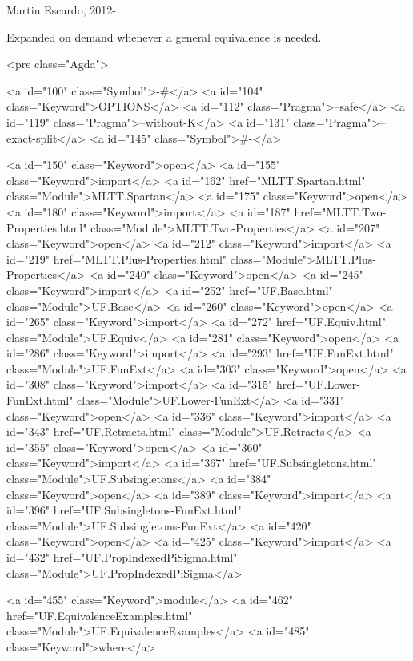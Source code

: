 Martin Escardo, 2012-

Expanded on demand whenever a general equivalence is needed.

<pre class="Agda">

<a id="100" class="Symbol">{-#</a> <a id="104" class="Keyword">OPTIONS</a> <a id="112" class="Pragma">--safe</a> <a id="119" class="Pragma">--without-K</a> <a id="131" class="Pragma">--exact-split</a> <a id="145" class="Symbol">#-}</a>

<a id="150" class="Keyword">open</a> <a id="155" class="Keyword">import</a> <a id="162" href="MLTT.Spartan.html" class="Module">MLTT.Spartan</a>
<a id="175" class="Keyword">open</a> <a id="180" class="Keyword">import</a> <a id="187" href="MLTT.Two-Properties.html" class="Module">MLTT.Two-Properties</a>
<a id="207" class="Keyword">open</a> <a id="212" class="Keyword">import</a> <a id="219" href="MLTT.Plus-Properties.html" class="Module">MLTT.Plus-Properties</a>
<a id="240" class="Keyword">open</a> <a id="245" class="Keyword">import</a> <a id="252" href="UF.Base.html" class="Module">UF.Base</a>
<a id="260" class="Keyword">open</a> <a id="265" class="Keyword">import</a> <a id="272" href="UF.Equiv.html" class="Module">UF.Equiv</a>
<a id="281" class="Keyword">open</a> <a id="286" class="Keyword">import</a> <a id="293" href="UF.FunExt.html" class="Module">UF.FunExt</a>
<a id="303" class="Keyword">open</a> <a id="308" class="Keyword">import</a> <a id="315" href="UF.Lower-FunExt.html" class="Module">UF.Lower-FunExt</a>
<a id="331" class="Keyword">open</a> <a id="336" class="Keyword">import</a> <a id="343" href="UF.Retracts.html" class="Module">UF.Retracts</a>
<a id="355" class="Keyword">open</a> <a id="360" class="Keyword">import</a> <a id="367" href="UF.Subsingletons.html" class="Module">UF.Subsingletons</a>
<a id="384" class="Keyword">open</a> <a id="389" class="Keyword">import</a> <a id="396" href="UF.Subsingletons-FunExt.html" class="Module">UF.Subsingletons-FunExt</a>
<a id="420" class="Keyword">open</a> <a id="425" class="Keyword">import</a> <a id="432" href="UF.PropIndexedPiSigma.html" class="Module">UF.PropIndexedPiSigma</a>

<a id="455" class="Keyword">module</a> <a id="462" href="UF.EquivalenceExamples.html" class="Module">UF.EquivalenceExamples</a> <a id="485" class="Keyword">where</a>

